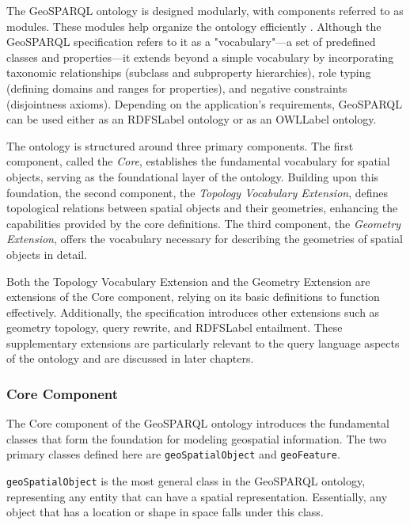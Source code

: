 The GeoSPARQL ontology is designed modularly, with components referred to as modules. These modules help organize the ontology efficiently \cite{grauModularReuseOntologies2008}. Although the GeoSPARQL specification refers to it as a "vocabulary"—a set of predefined classes and properties—it extends beyond a simple vocabulary by incorporating taxonomic relationships (subclass and subproperty hierarchies), role typing (defining domains and ranges for properties), and negative constraints (disjointness axioms). Depending on the application’s requirements, GeoSPARQL can be used either as an \acrshort{RDFSLabel} ontology or as an \acrshort{OWLLabel} ontology.

The ontology is structured around three primary components. The first component, called the \textit{Core}, establishes the fundamental vocabulary for spatial objects, serving as the foundational layer of the ontology. Building upon this foundation, the second component, the \textit{Topology Vocabulary Extension}, defines topological relations between spatial objects and their geometries, enhancing the capabilities provided by the core definitions. The third component, the \textit{Geometry Extension}, offers the vocabulary necessary for describing the geometries of spatial objects in detail.

Both the Topology Vocabulary Extension and the Geometry Extension are extensions of the Core component, relying on its basic definitions to function effectively. Additionally, the specification introduces other extensions such as geometry topology, query rewrite, and \acrshort{RDFSLabel} entailment. These supplementary extensions are particularly relevant to the query language aspects of the ontology and are discussed in later chapters.

\subsubsection{Core Component}\label{III-subsubsec:geosparqlCore}

The Core component of the GeoSPARQL ontology introduces the fundamental classes that form the foundation for modeling geospatial information. The two primary classes defined here are \texttt{\gls{geo}SpatialObject} and \texttt{\gls{geo}Feature}.

\texttt{\gls{geo}SpatialObject} is the most general class in the GeoSPARQL ontology, representing any entity that can have a spatial representation. Essentially, any object that has a location or shape in space falls under this class.

